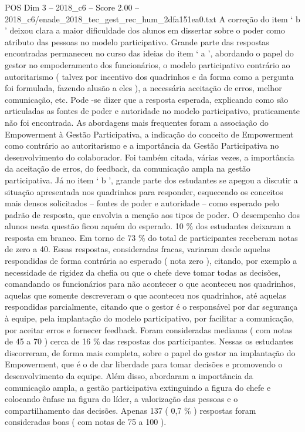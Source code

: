 \begin{textsample}{POS Dim 3 – 2018\_c6 – Score 2.00 – 2018\_c6/enade\_2018\_tec\_gest\_rec\_hum\_2dfa151ea0.txt}
A correção do item ‘ b ’ deixou clara a maior dificuldade dos alunos em dissertar sobre o poder como atributo das pessoas no modelo participativo.
Grande parte das respostas encontradas permaneceu no curso das ideias do item ‘ a ’, abordando o papel do gestor no empoderamento dos funcionários, o modelo participativo contrário ao autoritarismo ( talvez por incentivo dos quadrinhos e da forma como a pergunta foi formulada, fazendo alusão a eles ), a necessária aceitação de erros, melhor comunicação, etc.
Pode -se dizer que a resposta esperada, explicando como são articuladas as fontes de poder e autoridade no modelo participativo, praticamente não foi encontrada.
As abordagens mais frequentes foram a associação do Empowerment à Gestão Participativa, a indicação do conceito de Empowerment como contrário ao autoritarismo e a importância da Gestão Participativa no desenvolvimento do colaborador.
Foi também citada, várias vezes, a importância da aceitação de erros, do feedback, da comunicação ampla na gestão participativa.
Já no item ‘ b ’, grande parte dos estudantes se apegou a discutir a situação apresentada nos quadrinhos para responder, esquecendo os conceitos mais densos solicitados – fontes de poder e autoridade – como esperado pelo padrão de resposta, que envolvia a menção aos tipos de poder.
O desempenho dos alunos nesta questão ficou aquém do esperado. 10 \% dos estudantes deixaram a resposta em branco.
Em torno de 73 \% do total de participantes receberam notas de zero a 40.
Essas respostas, consideradas fracas, variaram desde aquelas respondidas de forma contrária ao esperado ( nota zero ), citando, por exemplo a necessidade de rigidez da chefia ou que o chefe deve tomar todas as decisões, comandando os funcionários para não acontecer o que aconteceu nos quadrinhos, aquelas que somente descreveram o que aconteceu nos quadrinhos, até aquelas respondidas parcialmente, citando que o gestor é o responsável por dar segurança à equipe, pela implantação do modelo participativo, por facilitar a comunicação, por aceitar erros e fornecer feedback.
Foram consideradas medianas ( com notas de 45 a 70 ) cerca de 16 \% das respostas dos participantes.
Nessas os estudantes discorreram, de forma mais completa, sobre o papel do gestor na implantação do Empowerment, que é o de dar liberdade para tomar decisões e promovendo o desenvolvimento da equipe.
Além disso, abordaram a importância da comunicação ampla, a gestão participativa extinguindo a figura do chefe e colocando ênfase na figura do líder, a valorização das pessoas e o compartilhamento das decisões.
Apenas 137 ( 0,7 \% ) respostas foram consideradas boas ( com notas de 75 a 100 ).

\end{textsample}
